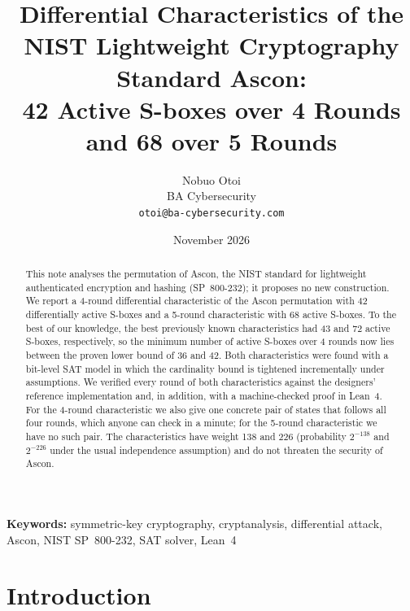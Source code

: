\documentclass[11pt,a4paper]{article}
\title{Differential Characteristics of the\\NIST Lightweight Cryptography Standard Ascon:\\42 Active S-boxes over 4 Rounds and 68 over 5 Rounds}
\author{Nobuo Otoi\\BA Cybersecurity\\\texttt{otoi@ba-cybersecurity.com}}
\date{November 2026}
\begin{document}
\maketitle

\begin{abstract}
This note analyses the permutation of Ascon, the NIST standard for lightweight authenticated
encryption and hashing (SP~800-232); it proposes no new construction. We report a 4-round
differential characteristic of the Ascon permutation with 42 differentially active S-boxes and a
5-round characteristic with 68 active S-boxes. To the best of our knowledge, the best previously known
characteristics had 43 and 72 active S-boxes, respectively, so the minimum number of active
S-boxes over 4 rounds now lies between the proven lower bound of 36 and 42. Both characteristics
were found with a bit-level SAT model in which the cardinality bound is tightened incrementally
under assumptions. We verified every round of both characteristics against the designers'
reference implementation and, in addition, with a machine-checked proof in Lean~4. For the
4-round characteristic we also give one concrete pair of states that follows all four rounds, which anyone
can check in a minute; for the 5-round characteristic we have no such pair.
The
characteristics have weight 138 and 226 (probability $2^{-138}$ and $2^{-226}$ under the usual independence assumption) and do not threaten the security of Ascon.
\end{abstract}

\noindent\textbf{Keywords:} symmetric-key cryptography, cryptanalysis, differential attack,
Ascon, NIST SP~800-232, SAT solver, Lean~4

\section{Introduction}
\end{document}
